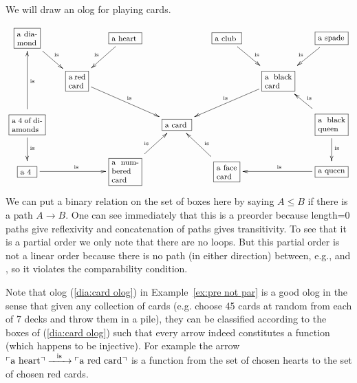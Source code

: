 \documentclass[../main/CT4S-EN-RU]{subfiles}
\begin{document}
\begin{exampleENG}\label{ex:pre not par}
We will draw an olog for playing cards. 
\begin{align}\label{dia:card olog}
\footnotesize
\xymatrixnocompile@=15pt{
\obox{}{.3in}{a diamond}\ar[dr]^{\tn{is}}&&\obox{}{.4in}{a heart}\ar[dl]_{\tn{is}}&&\obox{}{.35in}{a club}\ar[dr]^{\tn{is}}&&\obox{}{.4in}{a spade}\ar[dl]_{\tn{is}}\\
&\obox{}{.25in}{a red card}\ar[drr]^{\tn{is}}&&&&\obox{}{.4in}{a black card}\ar[dll]_{\tn{is}}\\
\obox{}{.45in}{a 4 of diamonds}\ar[d]^{\tn{is}}\ar[uu]_{\tn{is}}&&&\obox{}{.35in}{a card}&&&\obox{}{.4in}{a black queen}\ar[d]^{\tn{is}}\ar[ul]_{\tn{is}}\\
\obox{}{.2in}{a 4}\ar[rr]^{\tn{is}}&&\obox{}{.4in}{a numbered card}\ar[ur]^{\tn{is}}&&\obox{}{.3in}{a face card}\ar[ul]_{\tn{is}}&&\obox{}{.4in}{a queen}\ar[ll]_{\tn{is}}
}
\end{align}
We can put a binary relation on the set of boxes here by saying $A\leq B$ if there is a path $A\to B.$ One can see immediately that this is a preorder because length=0 paths give reflexivity and concatenation of paths gives transitivity. To see that it is a partial order we only note that there are no loops. But this partial order is not a linear order because there is no path (in either direction) between, e.g.,  and , so it violates the comparability condition.
\end{exampleENG}

\begin{exampleRUS}\label{ex:pre not par}
\end{exampleRUS}

\begin{remarkENG}
Note that olog (\ref{dia:card olog}) in Example~\ref{ex:pre not par} is a good olog in the sense that given any collection of cards (e.g. choose 45 cards at random from each of 7 decks and throw them in a pile), they can be classified according to the boxes of (\ref{dia:card olog}) such that every arrow indeed constitutes a function (which happens to be injective). For example the arrow $\textnormal{$\ulcorner$a heart$\urcorner$}\xrightarrow{\ \ \textnormal{is}\ \ }\textnormal{$\ulcorner$a red card$\urcorner$}$ is a function from the set of chosen hearts to the set of chosen red cards.
\end{remarkENG}

\begin{remarkRUS}
\end{remarkRUS}
\end{document}
